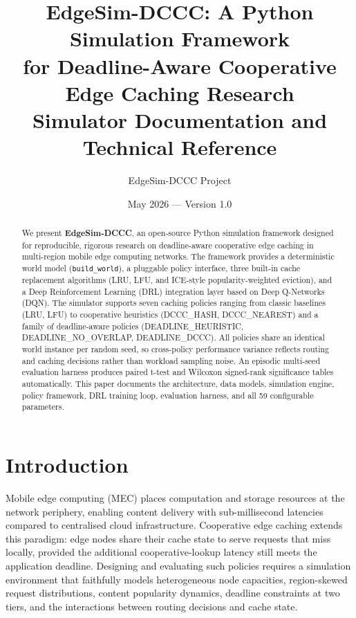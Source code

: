 \documentclass[12pt]{article}
\title{%
  \vspace{-1cm}%
  \textbf{EdgeSim-DCCC: A Python Simulation Framework}\\[4pt]
  \textbf{for Deadline-Aware Cooperative Edge Caching Research}\\[10pt]
  \large Simulator Documentation and Technical Reference
}
\author{EdgeSim-DCCC Project}
\date{May 2026 \quad --- \quad Version 1.0}
\begin{document}
\maketitle
\thispagestyle{empty}

\begin{abstract}
We present \textbf{EdgeSim-DCCC}, an open-source Python simulation framework designed for reproducible, rigorous research on deadline-aware cooperative edge caching in multi-region mobile edge computing networks. The framework provides a deterministic world model (\texttt{build\_world}), a pluggable policy interface, three built-in cache replacement algorithms (LRU, LFU, and ICE-style popularity-weighted eviction), and a Deep Reinforcement Learning (DRL) integration layer based on Deep Q-Networks (DQN). The simulator supports seven caching policies ranging from classic baselines (LRU, LFU) to cooperative heuristics (DCCC\_HASH, DCCC\_NEAREST) and a family of deadline-aware policies (DEADLINE\_HEURISTIC, DEADLINE\_NO\_OVERLAP, DEADLINE\_DCCC). All policies share an identical world instance per random seed, so cross-policy performance variance reflects routing and caching decisions rather than workload sampling noise. An episodic multi-seed evaluation harness produces paired t-test and Wilcoxon signed-rank significance tables automatically. This paper documents the architecture, data models, simulation engine, policy framework, DRL training loop, evaluation harness, and all 59 configurable parameters.
\end{abstract}

\tableofcontents

\newpage

\section{Introduction}

Mobile edge computing (MEC) places computation and storage resources at the network periphery, enabling content delivery with sub-millisecond latencies compared to centralised cloud infrastructure. Cooperative edge caching extends this paradigm: edge nodes share their cache state to serve requests that miss locally, provided the additional cooperative-lookup latency still meets the application deadline. Designing and evaluating such policies requires a simulation environment that faithfully models heterogeneous node capacities, region-skewed request distributions, content popularity dynamics, deadline constraints at two tiers, and the interactions between routing decisions and cache state.
\end{document}
